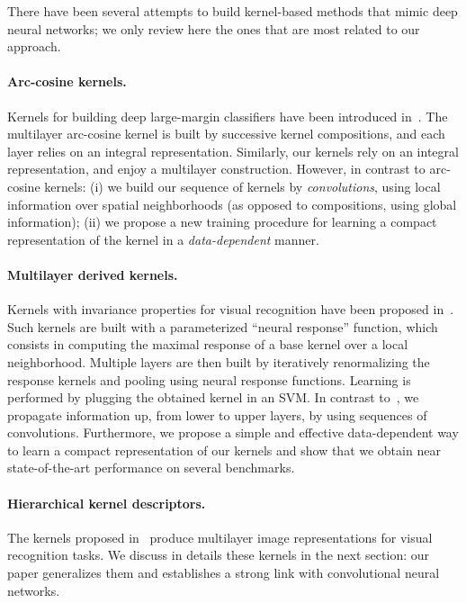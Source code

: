 There have been several attempts to build kernel-based methods that
mimic deep neural networks; we only review here the ones that are most related to our
approach. 

\vs
\paragraph{Arc-cosine kernels.}
Kernels for building deep large-margin classifiers have been
introduced in~\cite{cho2010}. The multilayer arc-cosine kernel 
is built by successive kernel compositions, and each layer
relies on an integral representation.
Similarly, our kernels rely on an integral representation, and
enjoy a multilayer construction. However, in contrast to arc-cosine kernels:
(i) we build our sequence of kernels by \emph{convolutions}, using local
information over spatial neighborhoods (as opposed to compositions, using
global information); (ii) we propose a new training procedure for learning
a compact representation of the kernel in a \emph{data-dependent} manner. 

\vs
\paragraph{Multilayer derived kernels.}
Kernels with invariance properties for visual
recognition have been proposed in~\cite{bou2009}. Such kernels are built with a 
parameterized ``neural response'' function, which consists in computing the
maximal response of a base kernel over a local neighborhood. 
Multiple layers are then built by iteratively renormalizing the response kernels
and pooling using neural response functions.  Learning is performed by plugging
the obtained kernel in an SVM. In contrast to~\cite{bou2009}, we propagate
information up, from lower to upper layers, by using sequences of convolutions.
Furthermore, we propose a simple and effective data-dependent way to learn a
compact representation of our kernels and show that we obtain near state-of-the-art
performance on several benchmarks. 

\paragraph{Hierarchical kernel descriptors.}
The kernels proposed in~\cite{bo2011,bo2010} produce multilayer image
representations for visual recognition tasks.  We discuss in details these kernels in the next
section: our paper generalizes them and establishes a strong link with
convolutional neural networks.

